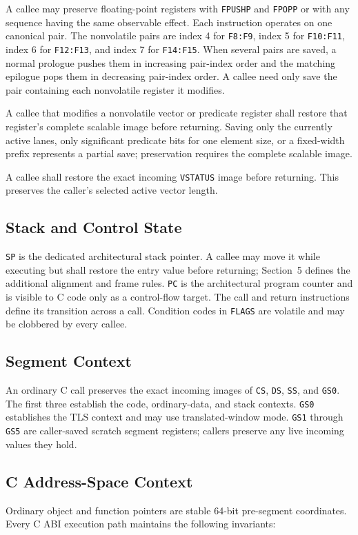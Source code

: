 \documentclass[10pt,twoside]{article}
\begin{document}
A callee may preserve floating-point registers with \texttt{FPUSHP} and
\texttt{FPOPP} or with any sequence having the same observable effect. Each
instruction operates on one canonical pair. The nonvolatile pairs are index 4
for \texttt{F8:F9}, index 5 for \texttt{F10:F11}, index 6 for
\texttt{F12:F13}, and index 7 for \texttt{F14:F15}. When several pairs are
saved, a normal prologue pushes them in increasing pair-index order and the
matching epilogue pops them in decreasing pair-index order. A callee need only
save the pair containing each nonvolatile register it modifies.

A callee that modifies a nonvolatile vector or predicate register shall
restore that register's complete scalable image before returning. Saving only
the currently active lanes, only significant predicate bits for one element
size, or a fixed-width prefix represents a partial save; preservation requires
the complete scalable image.

A callee shall restore the exact incoming \texttt{VSTATUS} image before
returning. This preserves the caller's selected active vector length.

\subsection{Stack and Control State}
\texttt{SP} is the dedicated architectural stack pointer. A
callee may move it while executing but shall restore the entry value before
returning; Section~5 defines the additional alignment and frame rules.
\texttt{PC} is the architectural program counter and is visible to C code
only as a control-flow target. The call and return instructions define its
transition across a call. Condition codes in
\texttt{FLAGS} are volatile and may be clobbered by every callee.

\subsection{Segment Context}
An ordinary C call preserves the exact incoming images of \texttt{CS},
\texttt{DS}, \texttt{SS}, and \texttt{GS0}. The first three establish the
code, ordinary-data, and stack contexts. \texttt{GS0} establishes the TLS
context and may use translated-window mode. \texttt{GS1} through \texttt{GS5}
are caller-saved scratch segment registers; callers preserve any live incoming
values they hold.

\subsection{C Address-Space Context}
Ordinary object and function pointers are stable 64-bit pre-segment
coordinates. Every C ABI execution path maintains the following invariants:
\end{document}
